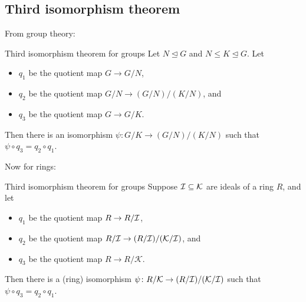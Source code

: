 \documentclass[12pt,letterpaper]{report}
\begin{document}
\pagebreak
\subsection{Third isomorphism theorem}

From group theory:

\begin{thm}{Third isomorphism theorem for groups}{}
  Let $N \trianglelefteq G$ and $N \leq K \trianglelefteq G$.
  Let
  \begin{itemize}
    \item $q_1$ be the quotient map $G \to G/N$,
    \item $q_2$ be the quotient map $G/N \to (G/N)/(K/N)$, and
    \item $q_3$ be the quotient map $G \to G/K$.
  \end{itemize}
  Then there is an isomorphism $\psi \colon G/K \to (G/N)/(K/N)$ such that
  $\psi \circ q_3 = q_2 \circ q_1$.
\end{thm}

\begin{center}
\end{center}

Now for rings:


\begin{thm}{Third isomorphism theorem for groups}{}
  Suppose $\mathcal{I} \subseteq \mathcal{K}$ are ideals of a ring $R$, and let
  \begin{itemize}
    \item $q_1$ be the quotient map $R \to R/\mathcal{I}$,
    \item $q_2$ be the quotient map $R/\mathcal{I} \to (R/\mathcal{I})/(\mathcal{K}/\mathcal{I})$, and
    \item $q_3$ be the quotient map $R \to R/\mathcal{K}$.
  \end{itemize}
  Then there is a (ring) isomorphism $\psi \colon R/\mathcal{K} \to (R/\mathcal{I})/(\mathcal{K}/\mathcal{I})$
  such that $\psi \circ q_3 = q_2 \circ q_1$.
\end{thm}

\begin{center}
\end{center}
\end{document}
